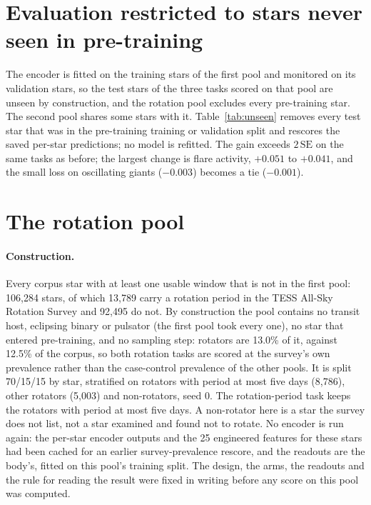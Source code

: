 \documentclass{article}
\begin{document}
\section{Evaluation restricted to stars never seen in pre-training}
\label{app:unseen}

The encoder is fitted on the training stars of the first pool and monitored on its validation stars,
so the test stars of
the three tasks scored on that pool are unseen by construction, and the rotation pool excludes every
pre-training star. The second pool shares some stars with
it. Table~\ref{tab:unseen} removes every test star that was in the pre-training training or validation
split and rescores the saved per-star predictions; no model is refitted. The gain exceeds
$2\,\mathrm{SE}$ on the same tasks as before; the largest change is flare activity, $+0.051$ to
$+0.041$, and the small loss on oscillating giants ($-0.003$) becomes a tie ($-0.001$).

\begin{table}[H]
\caption{The fusion gain (features\,$\oplus\,\mu$ minus features, linear readout) on all test stars and
on the test stars never seen in pre-training. Bold: beyond $2\,\mathrm{SE}$ over six encoder seeds.}
\label{tab:unseen}
\centering
\scriptsize

\end{table}

\section{The rotation pool}
\label{app:rotpool}

\paragraph{Construction.} Every corpus star with at least one usable window that is not in the
first pool: 106{,}284 stars, of which 13{,}789 carry a rotation period in the TESS All-Sky Rotation
Survey \citep{boyle2026} and 92{,}495 do not. By construction the pool contains no transit host,
eclipsing binary or pulsator (the first pool took every one), no star that entered pre-training, and
no sampling step: rotators are 13.0\% of it, against 12.5\% of the corpus, so both rotation tasks are
scored at the survey's own prevalence rather than the case-control prevalence of the other pools. It
is split 70/15/15 by star, stratified on rotators with period at most five days (8{,}786), other
rotators (5{,}003) and non-rotators, seed 0. The rotation-period task keeps the rotators with period
at most five days. A non-rotator here is a star the survey does not list, not a star examined and
found not to rotate. No encoder is run again: the per-star encoder outputs and the 25 engineered
features for these stars had been cached for an earlier survey-prevalence rescore, and the readouts
are the body's, fitted on this pool's training split. The design, the arms, the readouts and the rule
for reading the result were fixed in writing before any score on this pool was computed.
\end{document}
